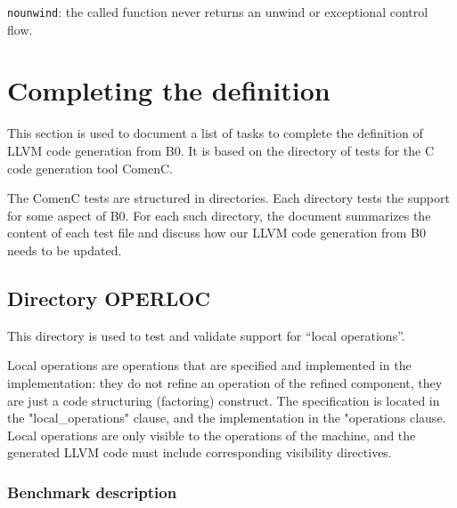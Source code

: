 \documentclass{article}
\begin{document}
\texttt{nounwind}: the called function never returns an unwind or exceptional
control flow.

\section{Completing the definition}

This section is used to document a list of tasks to complete the
definition of LLVM code generation from B0. It is based on the
directory of tests for the C code generation tool ComenC.

The ComenC tests are structured in directories. Each directory tests
the support for some aspect of B0. For each such directory, the
document summarizes the content of each test file and discuss how our
LLVM code generation from B0 needs to be updated.

\subsection{Directory OPERLOC}

This directory is used to test and validate support for ``local operations''.

Local operations are operations that are specified and implemented in
the implementation: they do not refine an operation of the refined
component, they are just a code structuring (factoring) construct. The
specification is located in the "local\_operations" clause, and the
implementation in the "operations clause. Local operations are only
visible to the operations of the machine, and the generated LLVM code
must include corresponding visibility directives.

\subsubsection{Benchmark description}
\end{document}
